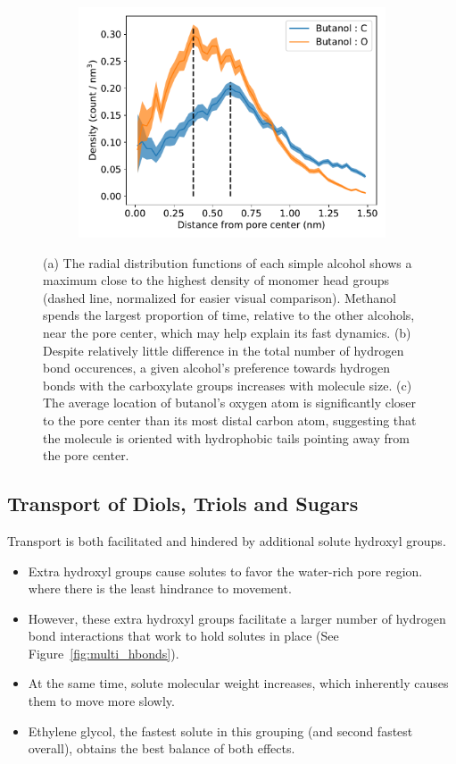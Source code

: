 \documentclass{article}
\begin{document}
\begin{figure}
\begin{subfigure}{0.325\textwidth}
  \includegraphics[width=\linewidth]{butanol_CO.pdf}  %
  \caption{}\label{fig:butanol_CO}
  \end{subfigure}
  \caption{(a) The radial distribution functions of each simple alcohol shows a maximum close
  to the highest density of monomer head groups (dashed line, normalized for easier visual
  comparison). Methanol spends the largest proportion of time, relative to the other alcohols,
  near the pore center, which may help explain its fast dynamics. (b) Despite relatively little
  difference in the total number of hydrogen bond occurences, a given alcohol's preference
  towards hydrogen bonds with the carboxylate groups increases with molecule size. (c) The average
  location of butanol's oxygen atom is significantly closer to the pore center than its most distal
  carbon atom, suggesting that the molecule is oriented with hydrophobic tails pointing away from
  the pore center.}\label{fig:simple_alcohols}
  \end{figure}

  \subsection*{Transport of Diols, Triols and Sugars}  %
  
  Transport is both facilitated and hindered by additional solute hydroxyl groups.
  \begin{itemize}
    \item Extra hydroxyl groups cause solutes to favor the water-rich pore region.
    where there is the least hindrance to movement.
    \item However, these extra hydroxyl groups facilitate a larger number of 
    hydrogen bond interactions that work to hold solutes in place (See Figure~\ref{fig:multi_hbonds}).
    \item At the same time, solute molecular weight increases, which inherently
    causes them to move more slowly.
    \item Ethylene glycol, the fastest solute in this grouping (and second fastest
    overall), obtains the best balance of both effects.
  \end{itemize}
  
\end{document}
